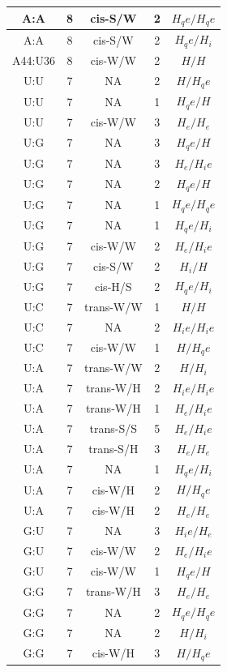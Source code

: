 \begin{center}
\begin{longtable}{c|c|c|c|c}
A:A & 8 & cis-S/W & 2 & $H_qe/H_qe$ \\  \hline
A:A & 8 & cis-S/W & 2 & $H_qe/H_i$ \\  \hline
A44:U36 & 8 & cis-W/W & 2 & $H/H$ \\  \hline
U:U & 7 & NA & 2 & $H/H_qe$ \\  \hline
U:U & 7 & NA & 1 & $H_qe/H$ \\  \hline
U:U & 7 & cis-W/W & 3 & $H_e/H_e$ \\  \hline
U:G & 7 & NA & 3 & $H_qe/H$ \\  \hline
U:G & 7 & NA & 3 & $H_e/H_ie$ \\  \hline
U:G & 7 & NA & 2 & $H_qe/H$ \\  \hline
U:G & 7 & NA & 1 & $H_qe/H_qe$ \\  \hline
U:G & 7 & NA & 1 & $H_qe/H_i$ \\  \hline
U:G & 7 & cis-W/W & 2 & $H_e/H_ie$ \\  \hline
U:G & 7 & cis-S/W & 2 & $H_i/H$ \\  \hline
U:G & 7 & cis-H/S & 2 & $H_qe/H_i$ \\  \hline
U:C & 7 & trans-W/W & 1 & $H/H$ \\  \hline
U:C & 7 & NA & 2 & $H_ie/H_ie$ \\  \hline
U:C & 7 & cis-W/W & 1 & $H/H_qe$ \\  \hline
U:A & 7 & trans-W/W & 2 & $H/H_i$ \\  \hline
U:A & 7 & trans-W/H & 2 & $H_ie/H_ie$ \\  \hline
U:A & 7 & trans-W/H & 1 & $H_e/H_ie$ \\  \hline
U:A & 7 & trans-S/S & 5 & $H_e/H_ie$ \\  \hline
U:A & 7 & trans-S/H & 3 & $H_e/H_e$ \\  \hline
U:A & 7 & NA & 1 & $H_qe/H_i$ \\  \hline
U:A & 7 & cis-W/H & 2 & $H/H_qe$ \\  \hline
U:A & 7 & cis-W/H & 2 & $H_e/H_e$ \\  \hline
G:U & 7 & NA & 3 & $H_ie/H_e$ \\  \hline
G:U & 7 & cis-W/W & 2 & $H_e/H_ie$ \\  \hline
G:U & 7 & cis-W/W & 1 & $H_qe/H$ \\  \hline
G:G & 7 & trans-W/H & 3 & $H_e/H_e$ \\  \hline
G:G & 7 & NA & 2 & $H_qe/H_qe$ \\  \hline
G:G & 7 & NA & 2 & $H/H_i$ \\  \hline
G:G & 7 & cis-W/H & 3 & $H/H_qe$ \\  \hline

\end{longtable}
\end{center}
